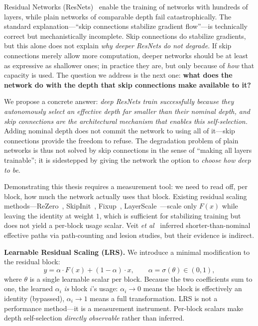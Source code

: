 \documentclass{bmvc2k}
\def\etal{\emph{et al}\bmvaOneDot}
\begin{document}
Residual Networks (ResNets)~\cite{he2016deep} enable the training of networks with hundreds of layers, while plain networks of comparable depth fail catastrophically. The standard explanation---``skip connections stabilize gradient flow''---is technically correct but mechanistically incomplete. Skip connections do stabilize gradients, but this alone does not explain \emph{why deeper ResNets do not degrade}. If skip connections merely allow more computation, deeper networks should be at least as expressive as shallower ones; in practice they are, but only because of \emph{how} that capacity is used. The question we address is the next one: \textbf{what does the network do with the depth that skip connections make available to it?}

We propose a concrete answer: \emph{deep ResNets train successfully because they autonomously select an effective depth far smaller than their nominal depth, and skip connections are the architectural mechanism that enables this self-selection.} Adding nominal depth does not commit the network to using all of it---skip connections provide the freedom to refuse. The degradation problem of plain networks is thus not solved by skip connections in the sense of ``making all layers trainable''; it is sidestepped by giving the network the option to \emph{choose how deep to be}.

Demonstrating this thesis requires a measurement tool: we need to read off, per block, how much the network actually uses that block. Existing residual scaling methods---ReZero~\cite{bachlechner2021rezero}, SkipInit~\cite{de2020batch}, Fixup~\cite{zhang2019fixup}, LayerScale~\cite{touvron2021going}---scale only $F(x)$ while leaving the identity at weight $1$, which is sufficient for stabilizing training but does not yield a per-block usage scalar. Veit \etal~\cite{veit2016residual} inferred shorter-than-nominal effective paths via path-counting and lesion studies, but their evidence is indirect.

\textbf{Learnable Residual Scaling (LRS).} We introduce a minimal modification to the residual block:
\begin{equation}
y = \alpha \cdot F(x) + (1-\alpha) \cdot x, \qquad \alpha = \sigma(\theta) \in (0,1),
\label{eq:lrs}
\end{equation}
where $\theta$ is a single learnable scalar per block. Because the two coefficients sum to one, the learned $\alpha_i$ \emph{is} block $i$'s usage: $\alpha_i \to 0$ means the block is effectively an identity (bypassed), $\alpha_i \to 1$ means a full transformation. LRS is not a performance method---it is a measurement instrument. Per-block scalars make depth self-selection \emph{directly observable} rather than inferred.
\end{document}
